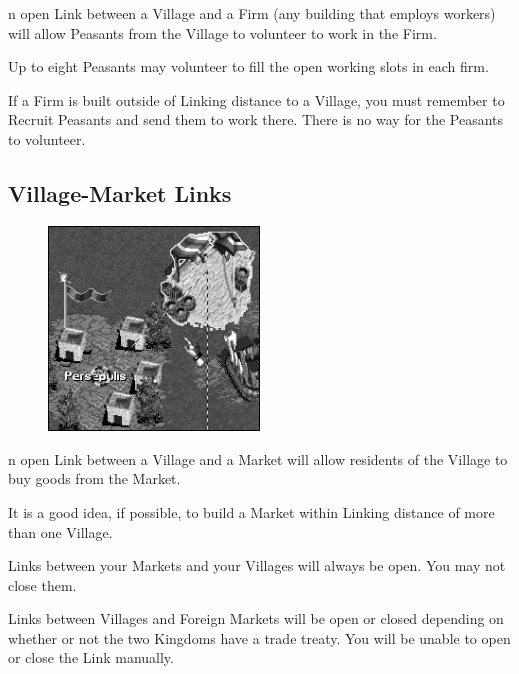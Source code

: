
n open Link between a Village and a Firm (any building that employs workers) will allow Peasants from the Village to volunteer to work in the Firm.

Up to eight Peasants may volunteer to fill the open working slots in each firm.

If a Firm is built outside of Linking distance to a Village, you must remember to Recruit Peasants and send them to work there. There is no way for the Peasants to volunteer.

\subsection{\textsf{Village-Market Links}}


\begin{figure}
    \vspace{-20pt}
    \begin{center}
        \includegraphics[width=0.5\textwidth]{Ilink_villagemarket} %
    \end{center}
    \vspace{-20pt}
\end{figure}

n open Link between a Village and a Market will allow residents of the Village to buy goods from the Market.

It is a good idea, if possible, to build a Market within Linking distance of more than one Village.

Links between your Markets and your Villages will always be open. You may not close them.

Links between Villages and Foreign Markets will be open or closed depending on whether or not the two Kingdoms have a trade treaty. You will be unable to open or close the Link manually.

